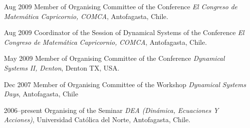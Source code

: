 \documentclass{article}
\begin{document}
\begin{CV}
\item[Aug 2009] Member of Organising Committee of the Conference
  \emph{El Congreso de Matemática Capricornio, COMCA}, Antofagasta, Chile.

\item[Aug 2009] Coordinator of the Session of Dynamical Systems of the
  Conference \emph{El Congreso de Matemática Capricornio, COMCA},
  Antofagasta, Chile.

\item[May 2009] Member of Organising Committee of the Conference
  \emph{Dynamical Systems II, Denton}, Denton TX, USA.


\item[Dec 2007] Member of Organising Committee of the Workshop
  \emph{Dynamical Systems Days}, Antofagasta, Chile

\item{2006--present} Organising of the Seminar \emph{DEA (Dinámica,
    Ecuaciones Y Acciones)}, Universidad Cat\'olica del Norte,
  Antofagasta, Chile.

\end{CV}








\end{document}
